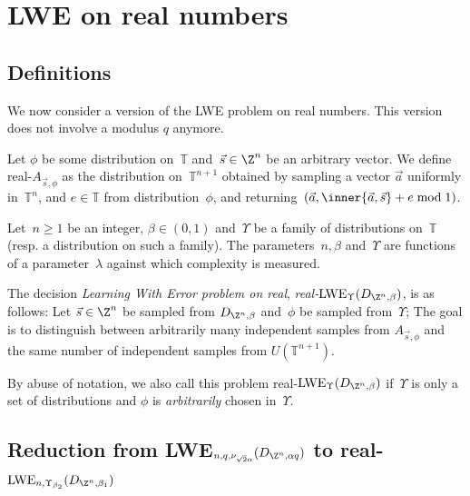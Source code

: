 \section{LWE on real numbers}


\subsection{Definitions}

We now consider a version of the LWE problem on real numbers. This version does not
involve a modulus $q$ anymore.

Let $\phi$ be some distribution on~$\mathbb{T}$ and~$\vec{s} \in \Z^n$ be an
arbitrary vector.  We define real-$A_{\vec{s},\phi}$ as the
distribution on~$\mathbb{T}^{n+1}$ obtained by sampling a
vector $\vec{a}$ uniformly in~$\mathbb{T}^{n}$, and $e \in \mathbb{T}$
from distribution~$\phi$, and returning~$(\vec{a}, \inner{\vec{a},\vec{s}}+ e \bmod 1)$.

\begin{definition}
  Let~$n \geq 1$ be an integer, $\beta \in (0,1)$ and~$\Upsilon$ be a family of distributions on~$\mathbb{T}$ (resp. a distribution on such a family). The parameters~$n, \beta$ and~$\Upsilon$ are functions of a parameter~$\lambda$ against which complexity is measured. 
  
  The decision \emph{Learning With Error problem on real}, \emph{real-$\text{LWE}_{\Upsilon}(D_{\Z^n, \beta})$}, is as follows: Let $\vec{s} \in \Z^n$ be sampled from $D_{\Z^n, \beta}$ and~$\phi$ be sampled from~$\Upsilon$; The goal is to distinguish between arbitrarily many independent samples from $A_{\vec{s},\phi}$ and the same number of independent samples from $U( \mathbb{T}^{n+1})$.
\end{definition}

By abuse of notation, we also call this problem real-$\text{LWE}_{\Upsilon}(D_{\Z^n, \beta})$ if~$\Upsilon$
is only a set of distributions and $\phi$ is \emph{arbitrarily} chosen in~$\Upsilon$.


\subsection{Reduction from LWE$_{n,q,\nu_{\sqrt{2}\alpha}}(D_{\Z^n, \alpha q})$ to real-$\text{LWE}_{n,\Upsilon_{\beta_2}}(D_{\Z^n, \beta_1})$}


